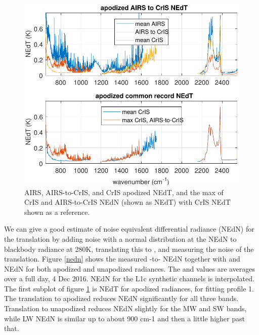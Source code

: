 \documentclass[journal]{IEEEtran}
\begin{document}
\begin{figure} %
  \centering
  \includegraphics[width=\linewidth]{figures/a2cris_nedt.pdf}
  \caption{AIRS, AIRS-to-CrIS, and CrIS apodized NEdT,
    and the max of CrIS and AIRS-to-CrIS NEdN (shown as
    NEdT) with CrIS NEdT shown as a reference.}
  \label{nedt}
\end{figure}

We can give a good estimate of noise equivalent differential
radiance (NEdN) for the translation by adding noise with a normal
distribution at the {\airs} NEdN to blackbody radiance at 280K,
translating this to {\cris}, and measuring the noise of the
translation.  Figure \ref{nedn} shows the measured
{\airs}-to-{\cris} NEdN together with {\airs} and {\cris} NEdN for
both apodized and unapodized radiances.  The {\airs} and {\cris}
values are averages over a full day, 4 Dec 2016.  NEdN for the L1c
synthetic channels is interpolated.  The first subplot of figure
\ref{nedt} is NEdT for apodized radiances, for fitting profile 1.
The translation to apodized {\cris} reduces NEdN significantly for
all three bands.  Translation to unapodized {\cris} reduces NEdN
slightly for the MW and SW bands, while LW NEdN is similar up to
about 900 cm-1 and then a little higher past that.

\end{document}
